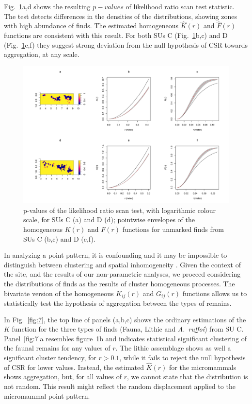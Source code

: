 \documentclass[review,authoryear]{elsarticle} %
\begin{document}
Fig.~\ref{fig:6}a,d shows the resulting $p-values$ of likelihood ratio scan test statistic. The test detects differences in the densities of the distributions, showing zones with high abundance of finds. The estimated homogeneous $\hat K(r)$ and $\hat F(r)$ functions are consistent with this result. For both SUs C (Fig.~\ref{fig:6}b,c) and D (Fig.~\ref{fig:6}e,f) they suggest strong deviation from the null hypothesis of CSR towards aggregation, at any scale.

\begin{figure}
  \centering
  \includegraphics[width=1\textwidth]{../artwork/Fig6.pdf}
  \caption{p-values of the likelihood ratio scan test, with logarithmic colour scale, for SUs C (a) and D (d); pointwise envelopes of the homogeneous $K(r)$ and $F(r)$ functions for unmarked finds from SUs C (b,c) and D (e,f).}
  \label{fig:6}
\end{figure}

In analyzing a point pattern, it is confounding and it may be impossible to distinguish between clustering and spatial inhomogeneity \citep{Baddeley2015}. Given the context of the site, and the results of our non-parametric analyses, we proceed considering the distributions of finds as the results of cluster homogeneous processes. The bivariate version of the homogeneous $K_{ij}(r)$ and $G_{ij}(r)$ functions allows us to statistically test the hypothesis of aggregation between the types of remains.

In Fig.~\ref{fig:7}, the top line of panels (a,b,c) shows the ordinary estimations of the $K$ function for the three types of finds (Fauna, Lithic and \emph{A.~ruffoi}) from SU C. Panel~\ref{fig:7}a resembles figure~\ref{fig:6}b and indicates statistical significant clustering of the faunal remains for any values of $r$. The lithic assemblage shows as well a significant cluster tendency, for $r>0.1$, while it fails to reject the null hypothesis of CSR for lower values. Instead, the estimated $\hat{K}(r)$ for the micromammals shows aggregation, but, for all values of $r$, we cannot state that the distribution is not random. This result might reflect the random displacement applied to the micromammal point pattern.
\end{document}
